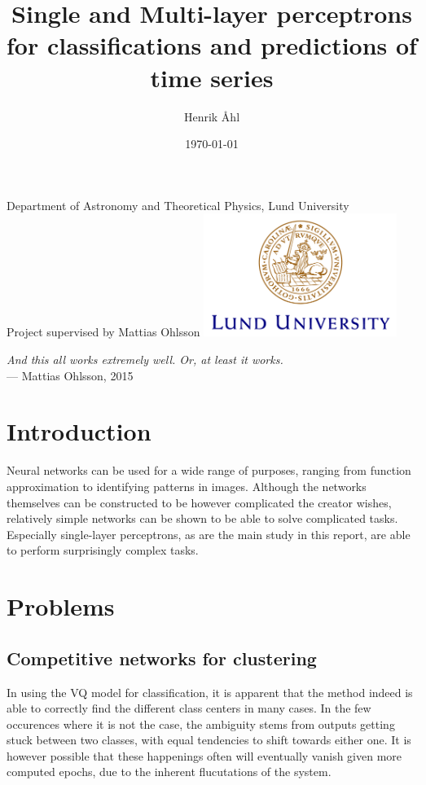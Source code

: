 \documentclass[a4paper,12pt]{article}
\title
{
	\textbf
	{
      Single and Multi-layer perceptrons for classifications and predictions of
      time series
   }
}
\author{Henrik Åhl\\}
\date{\today}
\theoremstyle{plain}
\theoremstyle{definition}
\begin{document}
\begin{titlepage}
	
   \maketitle 
	\begin{center}
		\phantom{a}
		{Department of Astronomy and Theoretical Physics, Lund University}
		\\[2cm]
		{Project supervised by Mattias Ohlsson}
		\vfill
		\includegraphics[height=4cm]{logocLUeng.pdf}
	\end{center}
	\thispagestyle{empty} %

\end{titlepage}

\vspace{5cm}
\noindent\textit{And this all works extremely well. Or, at least it works.}\\ --- Mattias Ohlsson, 2015
\newpage

\section{Introduction}
   Neural networks can be used for a wide range of purposes, ranging from
   function approximation to identifying patterns in images. Although the
   networks themselves can be constructed to be however complicated the creator
   wishes, relatively simple networks can be shown to be able to solve
   complicated tasks. Especially single-layer perceptrons, as are the main study in
   this report, are able to perform surprisingly complex tasks.

\section{Problems}
	\setcounter{equation}{0}
   \subsection{Competitive networks for clustering}
      In using the VQ model for classification, it is apparent that the method
      indeed is able to correctly find the different class centers in many
      cases. In the few occurences where it is not the case, the ambiguity stems
      from outputs getting stuck between two classes, with equal tendencies to
      shift towards either one. It is however possible that these happenings
      often will eventually vanish given more computed epochs, due to the
      inherent flucutations of the system.
\end{document}
